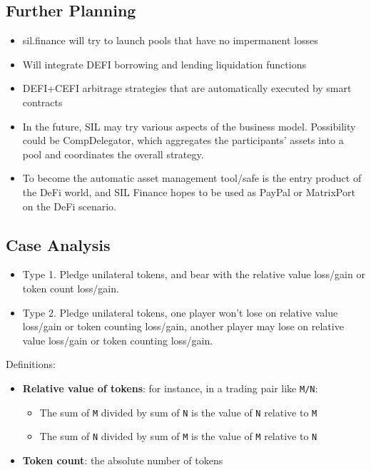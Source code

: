 \documentclass[11pt,letterpaper]{article}
\begin{document}
\begin{multicols}{2}
\subsection{Further Planning}
\begin{itemize}
  \item sil.finance will try to launch pools that have no impermanent losses
  \item Will integrate DEFI borrowing and lending liquidation functions
  \item DEFI+CEFI arbitrage strategies that are automatically executed by smart contracts
  \item In the future, SIL may try various aspects of the business model. Possibility could be CompDelegator, which aggregates the participants’ assets into a pool and coordinates the overall strategy.
  \item To become the automatic asset management tool/safe is the entry product of the DeFi world, and SIL Finance hopes to be used as PayPal or MatrixPort on the DeFi scenario.
\end{itemize}

\subsection{Case Analysis}
\begin{itemize}
  \item Type 1. Pledge unilateral tokens, and bear with the relative value loss/gain or token count loss/gain.
  \item Type 2. Pledge unilateral tokens, one player won't lose on relative value loss/gain or token counting loss/gain, another player may lose on relative value loss/gain or token counting loss/gain.
\end{itemize}

Definitions:
\begin{itemize}
  \item \textbf{Relative value of tokens}: for instance, in a trading pair like \texttt{M/N}:
  \begin{itemize}
    \item The sum of \texttt{M} divided by sum of \texttt{N} is the value of \texttt{N} relative to \texttt{M}
    \item The sum of \texttt{N} divided by sum of \texttt{M} is the value of \texttt{M} relative to \texttt{N}
  \end{itemize}
  \item \textbf{Token count}: the absolute number of tokens
\end{itemize}


\end{multicols}
\end{document}
